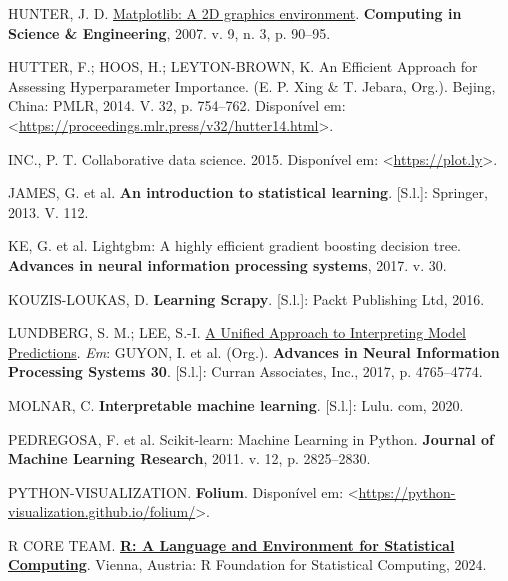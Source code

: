 \documentclass[
  12pt,
  a4paper,
]{scrreprt}
\newlength{\cslhangindent}
\newenvironment{CSLReferences}[2] %
 {\begin{list}{}{%
  \setlength{\itemindent}{0pt}
  \setlength{\leftmargin}{0pt}
  \setlength{\parsep}{0pt}
  \ifodd #1
   \setlength{\leftmargin}{\cslhangindent}
   \setlength{\itemindent}{-1\cslhangindent}
  \fi
  \setlength{\itemsep}{#2\baselineskip}}}
 {\end{list}}
\begin{document}
\begin{CSLReferences}{0}{1}
HUNTER, J. D. \href{https://doi.org/10.1109/MCSE.2007.55}{Matplotlib: A
2D graphics environment}. \textbf{Computing in Science \& Engineering},
2007. v. 9, n. 3, p. 90--95.

HUTTER, F.; HOOS, H.; LEYTON-BROWN, K. An Efficient Approach for
Assessing Hyperparameter Importance. (E. P. Xing \& T. Jebara, Org.).
Bejing, China: PMLR, 2014. V. 32, p. 754--762. Disponível em:
\textless{}\url{https://proceedings.mlr.press/v32/hutter14.html}\textgreater.

INC., P. T. Collaborative data science. 2015. Disponível em:
\textless{}\url{https://plot.ly}\textgreater.

JAMES, G. et al. \textbf{An introduction to statistical learning}.
{[}S.l.{]}: Springer, 2013. V. 112.

KE, G. et al. Lightgbm: A highly efficient gradient boosting decision
tree. \textbf{Advances in neural information processing systems}, 2017.
v. 30.

KOUZIS-LOUKAS, D. \textbf{Learning Scrapy}. {[}S.l.{]}: Packt Publishing
Ltd, 2016.

LUNDBERG, S. M.; LEE, S.-I.
\href{http://papers.nips.cc/paper/7062-a-unified-approach-to-interpreting-model-predictions.pdf}{A
Unified Approach to Interpreting Model Predictions}. \emph{Em}: GUYON,
I. et al. (Org.). \textbf{Advances in Neural Information Processing
Systems 30}. {[}S.l.{]}: Curran Associates, Inc., 2017, p. 4765--4774.

MOLNAR, C. \textbf{Interpretable machine learning}. {[}S.l.{]}: Lulu.
com, 2020.

PEDREGOSA, F. et al. Scikit-learn: Machine Learning in {P}ython.
\textbf{Journal of Machine Learning Research}, 2011. v. 12, p.
2825--2830.

PYTHON-VISUALIZATION. \textbf{Folium}. Disponível em:
\textless{}\url{https://python-visualization.github.io/folium/}\textgreater.

R CORE TEAM. \textbf{\href{https://www.R-project.org/}{R: A Language and
Environment for Statistical Computing}}. Vienna, Austria: R Foundation
for Statistical Computing, 2024.


\end{CSLReferences}
\end{document}
